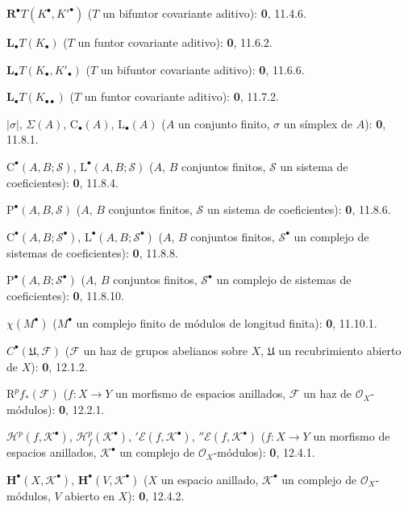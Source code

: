 \begin{flushleft}
$\mathbf R^\bullet T(K^\bullet,K'^{\bullet})$ ($T$ un bifuntor covariante
aditivo): \textbf 0, 11.4.6.

$\mathbf L_\bullet T(K_\bullet)$ ($T$ un funtor covariante aditivo): \textbf 0, 11.6.2.

$\mathbf L_\bullet T(K_\bullet,K'_\bullet)$ ($T$ un bifuntor covariante
aditivo): \textbf 0, 11.6.6.

$\mathbf L_\bullet T(K_{\bullet\bullet})$ ($T$ un funtor covariante aditivo):
\textbf 0, 11.7.2.

$|\sigma|$, $\Sigma(A)$, $\mathrm C_\bullet(A)$, $\mathrm L_\bullet(A)$
($A$ un conjunto finito, $\sigma$ un símplex de $A$): \textbf 0, 11.8.1.

$\mathrm C^\bullet(A,B;\mathscr S)$, $\mathrm L^\bullet(A,B;\mathscr S)$
($A$, $B$ conjuntos finitos, $\mathscr S$ un sistema de coeficientes): \textbf 0, 11.8.4.

$\mathrm P^\bullet(A,B,\mathscr S)$ ($A$, $B$ conjuntos finitos, $\mathscr S$ un
sistema de coeficientes): \textbf 0, 11.8.6.

$\mathrm C^\bullet(A,B;\mathscr S^\bullet)$,
$\mathrm L^\bullet(A,B;\mathscr S^\bullet)$ ($A$, $B$ conjuntos finitos,
$\mathscr S^\bullet$ un complejo de sistemas de coeficientes): \textbf 0, 11.8.8.

$\mathrm P^\bullet(A,B;\mathscr S^\bullet)$ ($A$, $B$ conjuntos finitos,
$\mathscr S^\bullet$ un complejo de sistemas de coeficientes): \textbf 0, 11.8.10.

$\chi(M^\bullet)$ ($M^\bullet$ un complejo finito de módulos de longitud finita):
\textbf 0, 11.10.1.

$C^\bullet(\mathfrak U,\mathcal F)$ ($\mathcal F$ un haz de grupos abelianos
sobre $X$, $\mathfrak U$ un recubrimiento abierto de $X$): \textbf 0, 12.1.2.

$\mathrm R^pf_*(\mathcal F)$ ($f:X\to Y$ un morfismo de espacios anillados,
$\mathcal F$ un haz de $\mathcal O_X$-módulos): \textbf 0, 12.2.1.

$\mathscr H^p(f,\mathcal K^\bullet)$,
$\mathscr H_f^p(\mathcal K^\bullet)$, ${}'\mathcal E(f,\mathcal K^\bullet)$,
${}''\mathcal E(f,\mathcal K^\bullet)$ ($f:X\to Y$ un morfismo de espacios anillados,
$\mathcal K^\bullet$ un complejo de $\mathcal O_X$-módulos): \textbf 0, 12.4.1.

$\mathbf H^\bullet(X,\mathcal K^\bullet)$,
$\mathbf H^\bullet(V,\mathcal K^\bullet)$ ($X$ un espacio anillado,
$\mathcal K^\bullet$ un complejo de $\mathcal O_X$-módulos, $V$ abierto en $X$):
\textbf 0, 12.4.2.


\end{flushleft}
